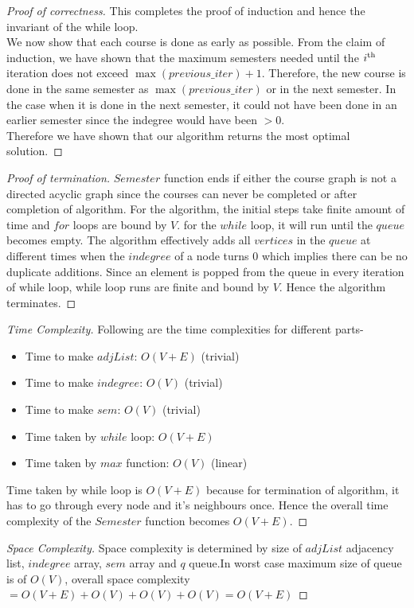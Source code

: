 \begin{solution}{2.2}
\begin{proof}[Proof of correctness]
        This completes the proof of induction and hence the invariant of the while loop.\\
        We now show that each course is done as early as possible. From the claim of induction, we have shown that the maximum semesters needed until the $i\textsuperscript{th}$ iteration does not exceed $\max(previous\_iter) + 1$. Therefore, the new course is done in the same semester as $\max(previous\_iter)$ or in the next semester. In the case when it is done in the next semester, it could not have been done in an earlier semester since the indegree would have been $>0$.\\
        Therefore we have shown that our algorithm returns the most optimal solution.

    \end{proof}
    \begin{proof}[Proof of termination]
        $Semester$ function ends if either the course graph is not a directed acyclic graph since the courses can never be completed or after completion of algorithm. For the algorithm, the initial steps take finite amount of time and $for$ loops are bound by $V$. for the $while$ loop, it will run until the $queue$ becomes empty. The algorithm effectively adds all $vertices$ in the $queue$ at different times when the $indegree$ of a node turns 0 which implies there can be no duplicate additions. Since an element is popped from the queue in every iteration of while loop, while loop runs are finite and bound by $V$. Hence the algorithm terminates.
    \end{proof}
    \begin{proof}[Time Complexity]
        Following are the time complexities for different parts-
        \begin{itemize}
            \item Time to make $adjList$: $O(V+E)$ (trivial)
            \item Time to make $indegree$: $O(V)$ (trivial)
            \item Time to make $sem$: $O(V)$ (trivial)
            \item Time taken by $while$ loop: $O(V+E)$ 
            \item Time taken by $max$ function: $O(V)$ (linear)
        \end{itemize}
        Time taken by while loop is $O(V+E)$ because for termination of algorithm, it has to go through every node and it's neighbours once. Hence the overall time complexity of the $Semester$ function becomes $O(V+E)$.
    \end{proof}
    \begin{proof}[Space Complexity]
        Space complexity is determined by size of $adjList$ adjacency list, $indegree$ array, $sem$ array and $q$ queue.In worst case maximum size of queue is of $O(V)$, overall space complexity $=O(V+E)+O(V)+O(V)+O(V)=O(V+E)$
    \end{proof}
\end{solution}
